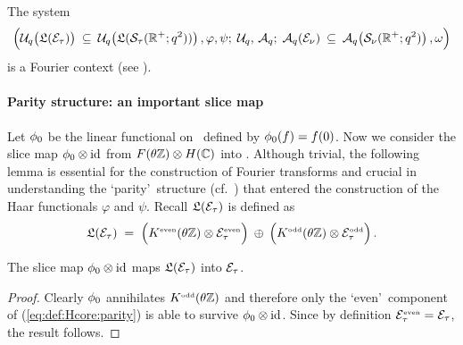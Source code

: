 \begin{thm} \label{thm:Fourier_context}
The system
$$\left( \Uq\!\left(\calL(\Hcore_\tau)\vertM\right) \: \subseteq\:
         \Uq\!\left(\calL({\mathcal S}_\tau(\RR^+;q^2)) \vertM \right),
                \varphi, \psi;\;    \Uq,\,\Aq;\;
                \Aq(\Hcore_\nu)\: \subseteq\:
         \Aq\!\left({\mathcal S}_\nu(\RR^+;q^2)\vertM \right),
          \omega \vertL \right)$$
is a Fourier context (see \cite{Jeroen:QE2:haar}).
\end{thm}



\paragraph{Parity structure: an important slice map}
Let $\phi_0$ be the linear functional on \FZ\ defined by $\phi_0(f)=f(0)$.
Now we consider the slice map $\phi_0 \otimes \mbox{\rm id}$ from $F(\theta \mathbb{Z}) \otimes H(\mathbb{C})$ into \HC\@.
Although trivial, the following lemma is essential for the construction of
Fourier transforms and crucial in understanding the \lq parity\rq\ structure
(cf.\ \mbox{\cite[remark 3.4.1.9]{Jeroen:QE2:haar}})
that entered the construction of the Haar functionals $\varphi$ and $\psi$.
Recall $\mathfrak{L}(\mathcal E_\tau)$ is defined as
\begin{equation} \label{eq:def:Hcore:parity}
\calL(\Hcore_\tau) \;=\;  \left(\KZeven \tens \Hcore_\tau^\scripteven \vertL\right) \:\oplus\:
                          \left(\KZodd  \tens \Hcore_\tau^\scriptodd \vertL\right).
\end{equation}


\begin{lemma} \label{lemma:slice_map:parity}
The slice map $\phi_0 \otimes \mbox{\rm id}$ maps $\mathfrak{L}(\mathcal E_\tau)$ into $\mathcal E_\tau$.
\end{lemma}
\begin{proof}
Clearly $\phi_0$ annihilates $K^{\rm \scriptscriptstyle odd}(\theta \mathbb{Z})$ and therefore only the \lq even\rq\ component of
(\ref{eq:def:Hcore:parity}) is able to survive $\phi_0 \otimes \mbox{\rm id}$.
Since by definition $\mathcal E_\tau^{\rm \scriptscriptstyle even} = \mathcal E_\tau$, the result follows.
\end{proof}


